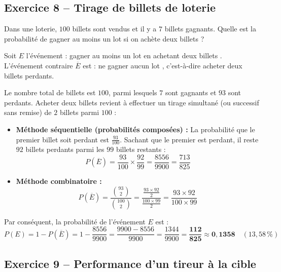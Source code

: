 \documentclass[11pt,a4paper]{article}
\begin{document}
\vspace{0.3cm}

\subsection*{Exercice 8 -- Tirage de billets de loterie}

Dans une loterie, $100$ billets sont vendus et il y a $7$ billets gagnants. Quelle est la probabilité de gagner au moins un lot si on achète deux billets ?

\begin{correctionbox}
Soit $E$ l'événement : \og gagner au moins un lot en achetant deux billets \fg{}.
L'événement contraire $\overline{E}$ est : \og ne gagner aucun lot \fg{}, c'est-à-dire acheter deux billets perdants.

Le nombre total de billets est $100$, parmi lesquels $7$ sont gagnants et $93$ sont perdants.
Acheter deux billets revient à effectuer un tirage simultané (ou successif sans remise) de $2$ billets parmi $100$ :
\begin{itemize}[label=$\bullet$]
    \item \textbf{Méthode séquentielle (probabilités composées) :}
    La probabilité que le premier billet soit perdant est $\frac{93}{100}$. Sachant que le premier est perdant, il reste $92$ billets perdants parmi les $99$ billets restants :
    \[
    P(\overline{E}) = \frac{93}{100} \times \frac{92}{99} = \frac{8556}{9900} = \frac{713}{825}
    \]
    \item \textbf{Méthode combinatoire :}
    \[
    P(\overline{E}) = \frac{\binom{93}{2}}{\binom{100}{2}} = \frac{\frac{93 \times 92}{2}}{\frac{100 \times 99}{2}} = \frac{93 \times 92}{100 \times 99}
    \]
\end{itemize}
Par conséquent, la probabilité de l'événement $E$ est :
\[
P(E) = 1 - P(\overline{E}) = 1 - \frac{8556}{9900} = \frac{9900 - 8556}{9900} = \frac{1344}{9900} = \mathbf{\frac{112}{825}} \approx \mathbf{0{,}1358} \quad (13{,}58\,\%)
\]
\end{correctionbox}

\vspace{0.3cm}

\subsection*{Exercice 9 -- Performance d'un tireur à la cible}
\end{document}
